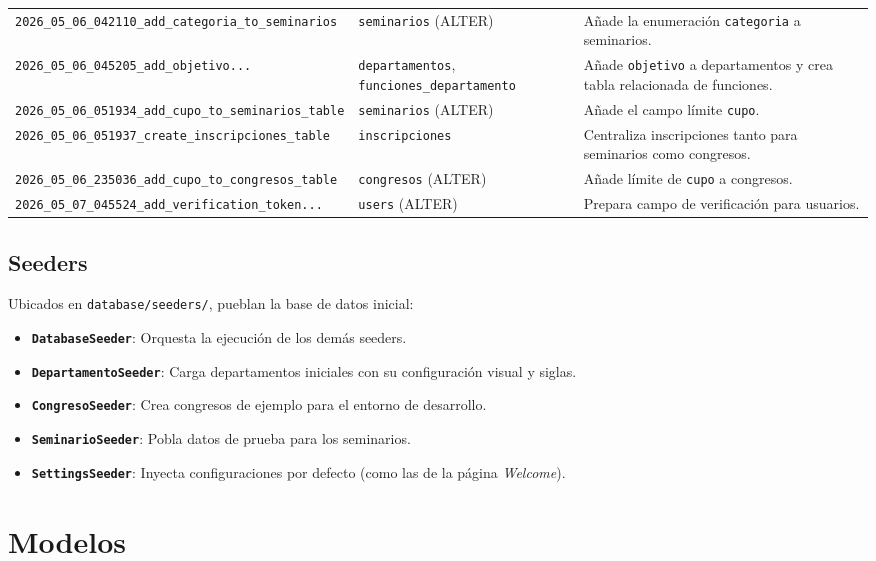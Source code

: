 \documentclass{article}
\begin{document}
\begin{longtable}{>{\raggedright\arraybackslash}p{6cm} >{\raggedright\arraybackslash}p{4cm} >{\raggedright\arraybackslash}p{5cm}}
\texttt{2026\_05\_06\_042110\_add\_categoria\_to\_seminarios} & \texttt{seminarios} (ALTER) & Añade la enumeración \texttt{categoria} a seminarios. \\
\texttt{2026\_05\_06\_045205\_add\_objetivo...} & \texttt{departamentos}, \texttt{funciones\_departamento} & Añade \texttt{objetivo} a departamentos y crea tabla relacionada de funciones. \\
\texttt{2026\_05\_06\_051934\_add\_cupo\_to\_seminarios\_table} & \texttt{seminarios} (ALTER) & Añade el campo límite \texttt{cupo}. \\
\texttt{2026\_05\_06\_051937\_create\_inscripciones\_table} & \texttt{inscripciones} & Centraliza inscripciones tanto para seminarios como congresos. \\
\texttt{2026\_05\_06\_235036\_add\_cupo\_to\_congresos\_table} & \texttt{congresos} (ALTER) & Añade límite de \texttt{cupo} a congresos. \\
\texttt{2026\_05\_07\_045524\_add\_verification\_token...} & \texttt{users} (ALTER) & Prepara campo de verificación para usuarios. \\
\end{longtable}

\subsection{Seeders}

Ubicados en \texttt{database/seeders/}, pueblan la base de datos inicial:
\begin{itemize}
    \item \textbf{\texttt{DatabaseSeeder}}: Orquesta la ejecución de los demás seeders.
    \item \textbf{\texttt{DepartamentoSeeder}}: Carga departamentos iniciales con su configuración visual y siglas.
    \item \textbf{\texttt{CongresoSeeder}}: Crea congresos de ejemplo para el entorno de desarrollo.
    \item \textbf{\texttt{SeminarioSeeder}}: Pobla datos de prueba para los seminarios.
    \item \textbf{\texttt{SettingsSeeder}}: Inyecta configuraciones por defecto (como las de la página \textit{Welcome}).
\end{itemize}

\section{Modelos}
\end{document}
